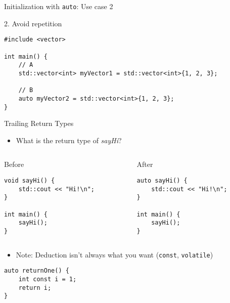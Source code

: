 \documentclass[t]{beamer}
\begin{document}
\begin{frame}[fragile]{Initialization with \texttt{auto}: Use case 2}

	{\large 2. Avoid repetition}

	\begin{verbatim}
#include <vector>

int main() {
	// A
	std::vector<int> myVector1 = std::vector<int>{1, 2, 3};

	// B
	auto myVector2 = std::vector<int>{1, 2, 3};
}
			\end{verbatim}

\end{frame}


\begin{frame}[fragile]{Trailing Return Types}
	\begin{itemize}
		\item What is the return type of \textit{sayHi}?
	\end{itemize}

	\vspace{10px}
	\begin{columns}[]
		\begin{column}{.48\textwidth}
			{\large Before}
			\begin{verbatim}
void sayHi() {
	std::cout << "Hi!\n";
}

int main() {
	sayHi();
}
			\end{verbatim}
		\end{column}
		\pause
		\begin{column}{.48\textwidth}
			{\large After}
			\begin{verbatim}
auto sayHi() {
	std::cout << "Hi!\n";
}

int main() {
	sayHi();
}
			\end{verbatim}
		\end{column}
	\end{columns}

	\vspace{10px}
	\begin{itemize}
		\item Note: Deduction isn't always what you want (\texttt{const}, \texttt{volatile})
	\end{itemize}
	\begin{verbatim}
auto returnOne() {
	int const i = 1;
	return i;
}
	\end{verbatim}
\end{frame}
\end{document}
